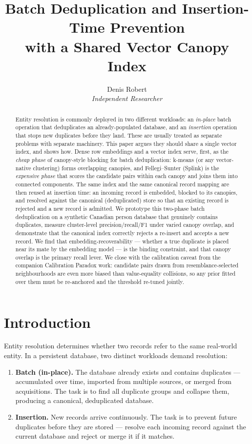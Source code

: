 \documentclass[11pt]{article}
\title{Batch Deduplication and Insertion-Time Prevention\\with a Shared Vector Canopy Index}
\author{Denis Robert\\\small \textit{Independent Researcher}}
\date{}
\begin{document}
\maketitle

\begin{abstract}
Entity resolution is commonly deployed in two different workloads: an \emph{in-place}
batch operation that deduplicates an already-populated database, and an \emph{insertion}
operation that stops new duplicates before they land. These are usually treated as separate
problems with separate machinery. This paper argues they should share a single vector index,
and shows how. Dense row embeddings and a vector index serve, first, as the
\emph{cheap phase} of canopy-style blocking for batch deduplication: k-means (or any
vector-native clustering) forms overlapping canopies, and Fellegi--Sunter (Splink) is the
\emph{expensive phase} that scores the candidate pairs within each canopy and joins them into
connected components. The same index and the same canonical record mapping are then reused at
insertion time: an incoming record is embedded, blocked to its canopies, and resolved against
the canonical (deduplicated) store so that an existing record is rejected and a new record is
admitted. We prototype this two-phase batch deduplication on a synthetic Canadian person
database that genuinely contains duplicates, measure cluster-level precision/recall/F1 under
varied canopy overlap, and demonstrate that the canonical index correctly rejects a re-insert
and accepts a new record. We find that embedding-recoverability --- whether a true duplicate
is placed near its mate by the embedding model --- is the binding constraint, and that
canopy overlap is the primary recall lever. We close with the calibration caveat from the
companion Calibration Paradox work: candidate pairs drawn from resemblance-selected
neighbourhoods are even more biased than value-equality collisions, so any prior fitted over
them must be re-anchored and the threshold re-tuned jointly.
\end{abstract}

\section{Introduction}
Entity resolution determines whether two records refer to the same real-world entity. In a
persistent database, two distinct workloads demand resolution:

\begin{enumerate}
  \item \textbf{Batch (in-place).} The database already exists and contains duplicates ---
        accumulated over time, imported from multiple sources, or merged from acquisitions.
        The task is to find all duplicate groups and collapse them, producing a canonical,
        deduplicated database.
  \item \textbf{Insertion.} New records arrive continuously. The task is to prevent
        future duplicates before they are stored --- resolve each incoming record against
        the current database and reject or merge it if it matches.
\end{enumerate}
\end{document}
